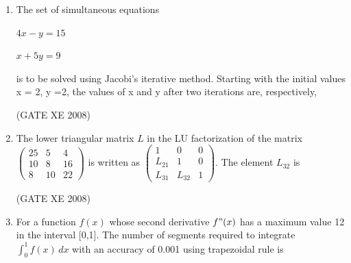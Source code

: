 \documentclass[12pt]{article}
\begin{document}
\begin{enumerate}
\begin{enumerate}
\item Two segment trapezoidal rule
\item One segment trapezoidal rule
\item Simpson's 3/8 rule
\item Simpson's 1/3 rule
\end{enumerate}

(GATE XE 2008)
\item The set of simultaneous equations \begin{center}$4x-y=15$ 

$x+5y=9$\end{center} is to be solved using Jacobi's iterative method. Starting with the initial values x = 2, y =2, the values of x and y after two iterations are, respectively,

\begin{enumerate}
\end{enumerate}

(GATE XE 2008)
\item The lower triangular matrix $L$ in the LU factorization of the matrix\newline
$\begin{pmatrix}
    25&5&4\\10&8&16\\8&10&22
\end{pmatrix}$ is written as $\begin{pmatrix}
    1&0&0\\L_{21}&1&0\\L_{31}&L_{32}&1
\end{pmatrix}$. The element $L_{32}$ is 

\begin{enumerate}
\end{enumerate}

(GATE XE 2008)
\item For a function $f(x)$ whose second derivative $f"(x)$ has a maximum value 12 in the interval [0,1]. The number of segments required to integrate $\int_{0}^{1} f(x) \,dx$
with an accuracy of 0.001 using trapezoidal rule is


\end{enumerate}
\end{document}
